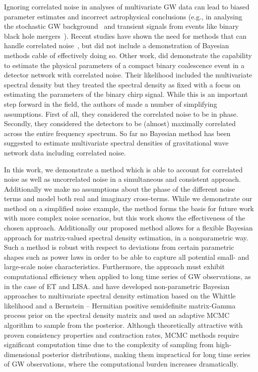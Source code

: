 \documentclass[%
 reprint,
 amsmath,amssymb,
 aps,
 nofootinbib,
]{revtex4-2}
\begin{document}
Ignoring correlated noise in analyses of multivariate \ac{GW} data can lead to biased parameter estimates and incorrect astrophysical conclusions (e.g., in analysing the stochastic \ac{GW} background~\cite{Thrane_correlations_SGWB, Christensen_2019_SGWB, boileau2022figures} and transient signals from events like binary black hole mergers~\cite{Cireddu:2023:arXiv}).
Recent studies have shown the need for methods that can handle correlated noise~\cite{Janssens2023}, but did not include a demonstration of Bayesian methods cable of effectively doing so. Other work, \cite{Cireddu:2023:arXiv} did demonstrate the capability to estimate the physical parameters of a compact binary coalescence event in a detector network with correlated noise. Their likelihood included the multivariate spectral density but they treated the spectral density as fixed with a focus on estimating the parameters of the binary chirp signal.  While this is an important step forward in the field, the authors of \cite{Cireddu:2023:arXiv} made a number of simplifying assumptions. First of all, they considered the correlated noise to be in phase. Secondly, they considered the detectors to be (almost) maximally correlated across the entire frequency spectrum. So far no Bayesian method has been suggested to estimate  multivariate spectral densities  of gravitational wave network data including correlated noise.

In this work, we demonstrate a method which is able to account for correlated noise as well as uncorrelated noise in a simultaneous and consistent approach. Additionally we make no assumptions about the phase of the different noise terms and model both real and imaginary cross-terms. While we demonstrate our method on a simplified noise example, the method forms the basis for future work with more complex noise scenarios, but this work shows the effectiveness of the chosen approach.
Additionally our proposed method allows for
 a flexible Bayesian approach for matrix-valued spectral density estimation, in a nonparametric way. Such a method is robust with respect to deviations from certain parametric shapes such as power laws in order to be able to capture all potential small- and large-scale noise characteristics.
Furthermore, the approach must exhibit computational efficiency when applied to long time series of \ac{GW} observations, as in the case of ET and LISA.
\citet{MeierAlexander2020Bnao} and \citet{Liu2023} have developed non-parametric Bayesian approaches to multivariate spectral density estimation based on the Whittle likelihood and a Bernstein -- Hermitian positive semidefinite matrix-Gamma process prior on the spectral density matrix and used an adaptive MCMC algorithm to sample from the posterior.
Although theoretically attractive with proven consistency properties and contraction rates, MCMC methods require significant computation time due to the complexity of sampling from high-dimensional posterior distributions, making them impractical for long time series of \ac{GW} observations, where the computational burden increases dramatically.
\end{document}
